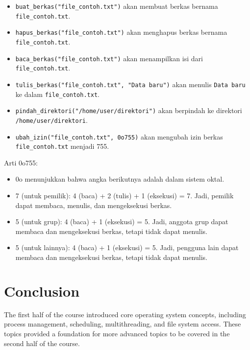 \documentclass[12pt]{article}
\begin{document}
\begin{itemize}
    \item \texttt{buat\_berkas("file\_contoh.txt")} akan membuat berkas bernama
    \\\texttt{file\_contoh.txt}.
    \item \texttt{hapus\_berkas("file\_contoh.txt")} akan menghapus berkas bernama \texttt{file\_contoh.txt}.
    \item \texttt{baca\_berkas("file\_contoh.txt")} akan menampilkan isi dari
    \\\texttt{file\_contoh.txt}.
    \item \texttt{tulis\_berkas("file\_contoh.txt", "Data baru")} akan menulis \texttt{Data baru} ke dalam \texttt{file\_contoh.txt}.
    \item \texttt{pindah\_direktori("/home/user/direktori")} akan berpindah ke direktori \texttt{/home/user/direktori}.
    \item \texttt{ubah\_izin("file\_contoh.txt", 0o755)} akan mengubah izin berkas \texttt{file\_contoh.txt} menjadi 755.
\end{itemize}
Arti 0o755:
\begin{itemize}
    \item 0o menunjukkan bahwa angka berikutnya adalah dalam sistem oktal.
    \item 7 (untuk pemilik): 4 (baca) + 2 (tulis) + 1 (eksekusi) = 7. Jadi, pemilik dapat membaca, menulis, dan mengeksekusi berkas.
    \item 5 (untuk grup): 4 (baca) + 1 (eksekusi) = 5. Jadi, anggota grup dapat membaca dan mengeksekusi berkas, tetapi tidak dapat menulis.
    \item 5 (untuk lainnya): 4 (baca) + 1 (eksekusi) = 5. Jadi, pengguna lain dapat membaca dan mengeksekusi berkas, tetapi tidak dapat menulis.
\end{itemize}

\section{Conclusion}
The first half of the course introduced core operating system concepts, including process management, scheduling, multithreading, and file system access. These topics provided a foundation for more advanced topics to be covered in the second half of the course.

\newpage %
\printbibliography{} %
\end{document}
